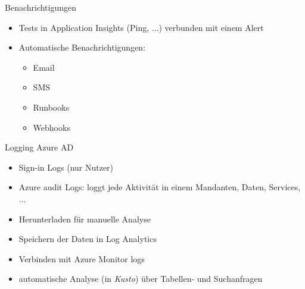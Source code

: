 
\begin{flashcard}[Definition]{Benachrichtigungen}
  \begin{itemize}
    \item Tests in Application Insights (Ping, $\ldots$) verbunden mit einem Alert
    \item Automatische Benachrichtigungen:
    \begin{itemize}
      \item Email
      \item SMS
      \item Runbooks
      \item Webhooks
    \end{itemize}

  \end{itemize}
\end{flashcard}


\begin{flashcard}[Definition]{Logging Azure AD}
  \begin{itemize}
    \item Sign-in Logs (nur Nutzer)
    \item Azure audit Logs: \newline
      loggt jede Aktivität in einem Mandanten, Daten, Services, ...
    \item Herunterladen für manuelle Analyse
    \item Speichern der Daten in Log Analytics
    \item Verbinden mit Azure Monitor logs
    \item automatische Analyse (in \emph{Kusto}) über Tabellen- und Suchanfragen
  \end{itemize}
\end{flashcard}
